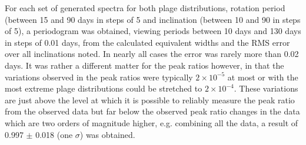 \begin{table}[!htbp]
\caption{Simulated mean equivalent widths with associated standard deviations from simulations for the 2.7\%
  plage distributions and a set of rotation periods and inclinations. In the first table results are illustrated for
  various periods and for 30{\degree}, 60{\degree} and  90{\degree} inclinations. In the second table results are
  illustrated for various inclinations and 70, 80 and 90-day periods as these are close to the
  rotation period of \prox.}
\protect\label{table:modelcomp}
\end{table}

For each set of generated spectra for both plage distributions, rotation period (between 15 and 90 days in steps of 5
and inclination (between 10{\degree} and 90{\degree} in steps of 5\degree), a periodogram was obtained, viewing periods
between 10 days and 130 days in steps of 0.01 days, from the calculated equivalent widths and the RMS error over all
inclinations noted. In nearly all cases the error was rarely more than 0.02 days. It was rather a different matter for
the peak ratios however, in that the variations observed in the peak ratios were typically $2{\times}10^{-5}$ at most or
with the most extreme plage distributions could be stretched to $2{\times}10^{-4}$. These variations are just above the
level at which it is possible to reliably measure the peak ratio from the observed data but far below the observed peak
ratio changes in the data which are two orders of magnitude higher, e.g. combining all the {\harps} data, a result of
0.997 $ \pm $ 0.018 (one $\sigma$) was obtained.

